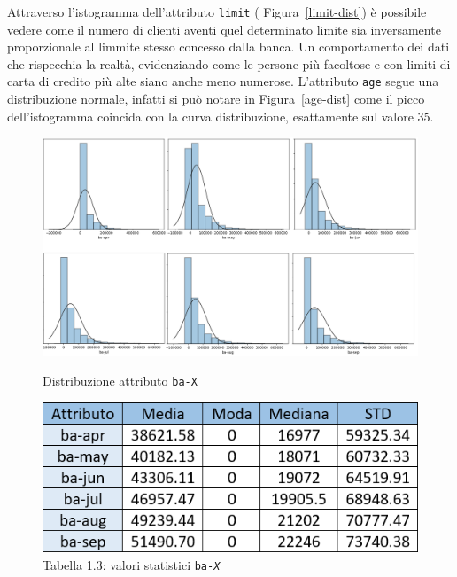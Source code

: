 Attraverso l'istogramma dell'attributo \texttt{limit} ( Figura~\ref{limit-dist}) \`e possibile vedere come il numero di clienti aventi quel determinato limite sia inversamente proporzionale al limmite stesso concesso dalla banca. Un comportamento dei dati che rispecchia la realt\`a, evidenziando come le persone pi\`u facoltose e con limiti di carta di credito pi\`u alte siano anche meno numerose. L'attributo \texttt{age} segue una distribuzione normale, infatti si pu\`o notare in Figura~\ref{age-dist} come il picco dell'istogramma coincida con la curva distribuzione, esattamente sul valore 35.

\begin{figure}[!htb]
  \includegraphics[width=\linewidth]{img/ba-distribution.png}
  \caption{Distribuzione attributo \texttt{ba-X}}\label{ba-dist}
\endminipage\hfill
{}
  \includegraphics[width=\linewidth]{img/ba-stat.png}
\captionsetup{labelformat=empty}
\caption{Tabella 1.3: valori statistici \texttt{ba-\textit{X}}}
\label{ba-stat}
\endminipage\hfill
\end{figure}

